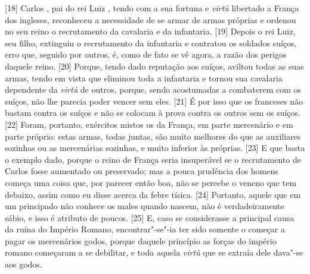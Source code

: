 {[}18{]} Carlos , pai do rei Luiz
, tendo com a sua fortuna e \emph{virtù} libertado a França dos
ingleses,
reconheceu a necessidade de se armar de armas próprias e ordenou no seu
reino o recrutamento da cavalaria e da infantaria. {[}19{]} Depois o rei
Luiz, seu filho, extinguiu o
recrutamento da infantaria e contratou os soldados suíços, erro que,
seguido por outros, é, como de fato se vê agora, a razão dos perigos
daquele reino. {[}20{]} Porque, tendo dado reputação aos suíços, aviltou
todas as suas armas, tendo em vista que eliminou toda a infantaria e
tornou sua cavalaria dependente da \emph{virtù} de outros, porque, sendo
acostumadas a combaterem com os suíços, não lhe parecia poder vencer sem
eles. {[}21{]} É por isso que os franceses não bastam contra os suíços e
não se colocam à prova contra os outros sem os suíços. {[}22{]} Foram,
portanto, exércitos mistos os da França, em parte mercenário e em parte
próprio: estas armas, todas juntas, são muito melhores do que as
auxiliares sozinhas ou as mercenárias sozinhas, e muito inferior às
próprias. {[}23{]} E que basta o exemplo dado, porque o reino de França
seria insuperável se o recrutamento de Carlos fosse aumentado ou
preservado; mas a pouca prudência dos homens começa uma coisa que, por
parecer então boa, não se percebe o veneno que tem debaixo, assim como
eu disse acerca da febre tísica. {[}24{]} Portanto, aquele que em um principado não conhece
os males quando nascem, não é verdadeiramente sábio, e isso é atributo
de poucos. {[}25{]} E, caso se considerasse a principal causa da ruína
do Império Romano, encontrar"-se"-ia ter sido somente o começar a pagar os
mercenários godos,
porque daquele princípio as forças do império romano começaram a se
debilitar, e toda aquela \emph{virtù} que se extraía dele dava"-se aos
godos.

